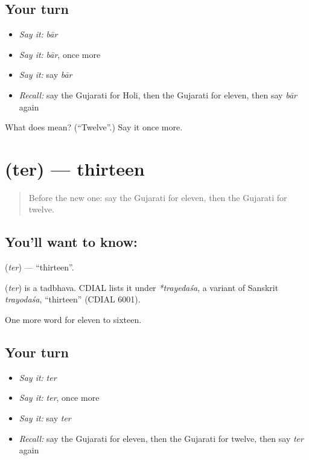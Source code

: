 \subsection*{Your turn}
\begin{itemize}
\raggedright
  \item \emph{Say it:} \emph{bār}
  \item \emph{Say it:} \emph{bār}, once more
  \item \emph{Say it:} say \emph{bār}
  \item \emph{Recall:} say the Gujarati for Holi, then the Gujarati for eleven, then say \emph{bār} again
\end{itemize}

\begin{tcolorbox}[breakable,colback=teal!4,colframe=teal!35!black,title={Before you move on}]
What does  mean? (\textquotedblleft{}Twelve\textquotedblright{}.) Say it once more.
\end{tcolorbox}
\section[\texorpdfstring{\gu{તેર} (ter)}{તેર (ter)}]{ (ter) — thirteen}

\label{lesson:GU-C81-thirteen}



\begin{quote}
Before the new one: say the Gujarati for eleven, then the Gujarati for twelve.
\end{quote}

\subsection*{You'll want to know: }
\textbf{} (\emph{ter}) — \textquotedblleft{}thirteen\textquotedblright{}.

\begin{cousinweb}
\textbf{} (\emph{ter}) is a tadbhava. CDIAL lists it under \emph{*trayedaśa}, a variant of Sanskrit \emph{trayodaśa}, \textquotedblleft{}thirteen\textquotedblright{} (CDIAL 6001).
\end{cousinweb}

\begin{grammarlens}[title={What you've built}]
One more word for eleven to sixteen.
\end{grammarlens}

\subsection*{Your turn}
\begin{itemize}
\raggedright
  \item \emph{Say it:} \emph{ter}
  \item \emph{Say it:} \emph{ter}, once more
  \item \emph{Say it:} say \emph{ter}
  \item \emph{Recall:} say the Gujarati for eleven, then the Gujarati for twelve, then say \emph{ter} again
\end{itemize}

